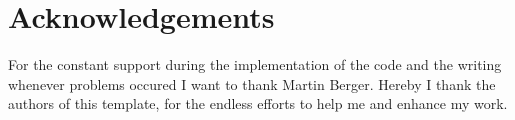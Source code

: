 \newpage
\chapter*{Acknowledgements}
For the constant support during the implementation of the code and the writing whenever problems occured I want to thank Martin Berger. Hereby I thank the authors of this template, for the endless efforts to help me and enhance my work.
